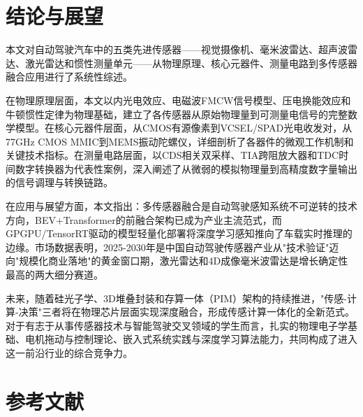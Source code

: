 \documentclass[12pt,a4paper,openany,UTF8]{ctexbook}
\begin{document}
\clearpage

\chapter{结论与展望}

本文对自动驾驶汽车中的五类先进传感器——视觉摄像机、毫米波雷达、超声波雷达、激光雷达和惯性测量单元——从物理原理、核心元器件、测量电路到多传感器融合应用进行了系统性综述。

在物理原理层面，本文以内光电效应、电磁波FMCW信号模型、压电换能效应和牛顿惯性定律为物理基础，建立了各传感器从原始物理量到可测量电信号的完整数学模型。在核心元器件层面，从CMOS有源像素到VCSEL/SPAD光电收发对，从77GHz CMOS MMIC到MEMS振动陀螺仪，详细剖析了各器件的微观工作机制和关键技术指标。在测量电路层面，以CDS相关双采样、TIA跨阻放大器和TDC时间数字转换器为代表性案例，深入阐述了从微弱的模拟物理量到高精度数字量输出的信号调理与转换链路。

在应用与展望方面，本文指出：多传感器融合是自动驾驶感知系统不可逆转的技术方向，BEV+Transformer的前融合架构已成为产业主流范式，而GPGPU/TensorRT驱动的模型轻量化部署将深度学习感知推向了车载实时推理的边缘。市场数据表明，2025-2030年是中国自动驾驶传感器产业从"技术验证"迈向"规模化商业落地"的黄金窗口期，激光雷达和4D成像毫米波雷达是增长确定性最高的两大细分赛道。

未来，随着硅光子学、3D堆叠封装和存算一体（PIM）架构的持续推进，"传感-计算-决策"三者将在物理芯片层面实现深度融合，形成传感计算一体化的全新范式。对于有志于从事传感器技术与智能驾驶交叉领域的学生而言，扎实的物理电子学基础、电机拖动与控制理论、嵌入式系统实践与深度学习算法能力，共同构成了进入这一前沿行业的综合竞争力。

\clearpage

\chapter*{\heiti 参考文献}
\end{document}
